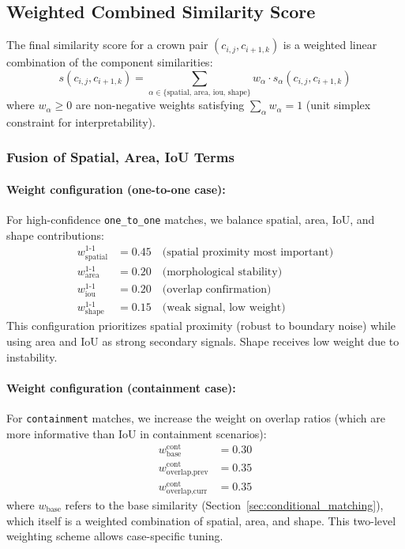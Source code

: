 \subsection{Weighted Combined Similarity Score}

The final similarity score for a crown pair $(c_{i,j}, c_{i+1,k})$ is a weighted linear combination of the component similarities:
\[
s(c_{i,j}, c_{i+1,k}) = \sum_{\alpha \in \{\text{spatial, area, iou, shape}\}} w_\alpha \cdot s_\alpha(c_{i,j}, c_{i+1,k})
\]
where $w_\alpha \geq 0$ are non-negative weights satisfying $\sum_\alpha w_\alpha = 1$ (unit simplex constraint for interpretability).

\subsubsection{Fusion of Spatial, Area, IoU Terms}

\paragraph{Weight configuration (one-to-one case):}
For high-confidence \texttt{one\_to\_one} matches, we balance spatial, area, IoU, and shape contributions:
\[
\begin{aligned}
w_{\text{spatial}}^{\text{1-1}} &= 0.45 \quad \text{(spatial proximity most important)} \\
w_{\text{area}}^{\text{1-1}} &= 0.20 \quad \text{(morphological stability)} \\
w_{\text{iou}}^{\text{1-1}} &= 0.20 \quad \text{(overlap confirmation)} \\
w_{\text{shape}}^{\text{1-1}} &= 0.15 \quad \text{(weak signal, low weight)}
\end{aligned}
\]
This configuration prioritizes spatial proximity (robust to boundary noise) while using area and IoU as strong secondary signals. Shape receives low weight due to instability.

\paragraph{Weight configuration (containment case):}
For \texttt{containment} matches, we increase the weight on overlap ratios (which are more informative than IoU in containment scenarios):
\[
\begin{aligned}
w_{\text{base}}^{\text{cont}} &= 0.30 \\
w_{\text{overlap,prev}}^{\text{cont}} &= 0.35 \\
w_{\text{overlap,curr}}^{\text{cont}} &= 0.35
\end{aligned}
\]
where $w_{\text{base}}$ refers to the base similarity (Section~\ref{sec:conditional_matching}), which itself is a weighted combination of spatial, area, and shape. This two-level weighting scheme allows case-specific tuning.


